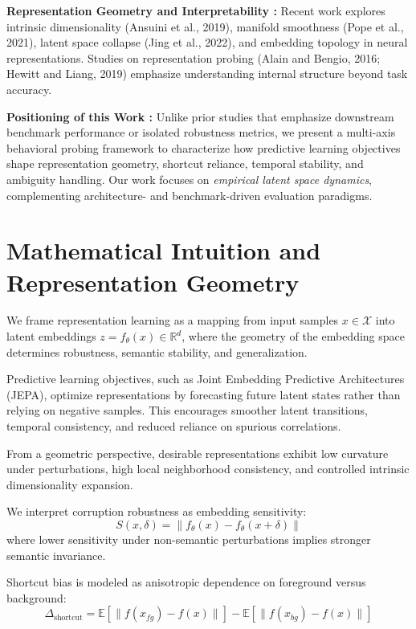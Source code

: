 \documentclass[10pt,twocolumn]{article}
\begin{document}
\textbf{Representation Geometry and Interpretability :}
Recent work explores intrinsic dimensionality (Ansuini et al., 2019), manifold smoothness (Pope et al., 2021), latent space collapse (Jing et al., 2022), and embedding topology in neural representations. Studies on representation probing (Alain and Bengio, 2016; Hewitt and Liang, 2019) emphasize understanding internal structure beyond task accuracy.


\textbf{Positioning of this Work :}
Unlike prior studies that emphasize downstream benchmark performance or isolated robustness metrics, we present a multi-axis behavioral probing framework to characterize how predictive learning objectives shape representation geometry, shortcut reliance, temporal stability, and ambiguity handling. Our work focuses on \textit{empirical latent space dynamics}, complementing architecture- and benchmark-driven evaluation paradigms.
\section{Mathematical Intuition and Representation Geometry}

We frame representation learning as a mapping from input samples $x \in \mathcal{X}$ into latent embeddings $z = f_\theta(x) \in \mathbb{R}^d$, where the geometry of the embedding space determines robustness, semantic stability, and generalization.

Predictive learning objectives, such as Joint Embedding Predictive Architectures (JEPA), optimize representations by forecasting future latent states rather than relying on negative samples. This encourages smoother latent transitions, temporal consistency, and reduced reliance on spurious correlations.

From a geometric perspective, desirable representations exhibit low curvature under perturbations, high local neighborhood consistency, and controlled intrinsic dimensionality expansion.

We interpret corruption robustness as embedding sensitivity:
\begin{equation}
S(x, \delta) = \left\| f_\theta(x) - f_\theta(x + \delta) \right\|
\end{equation}
where lower sensitivity under non-semantic perturbations implies stronger semantic invariance.

Shortcut bias is modeled as anisotropic dependence on foreground versus background:
\begin{equation}
\Delta_{\text{shortcut}} = \mathbb{E}\left[\| f(x_{fg}) - f(x) \| \right] - \mathbb{E}\left[\| f(x_{bg}) - f(x) \| \right]
\end{equation}
\end{document}
